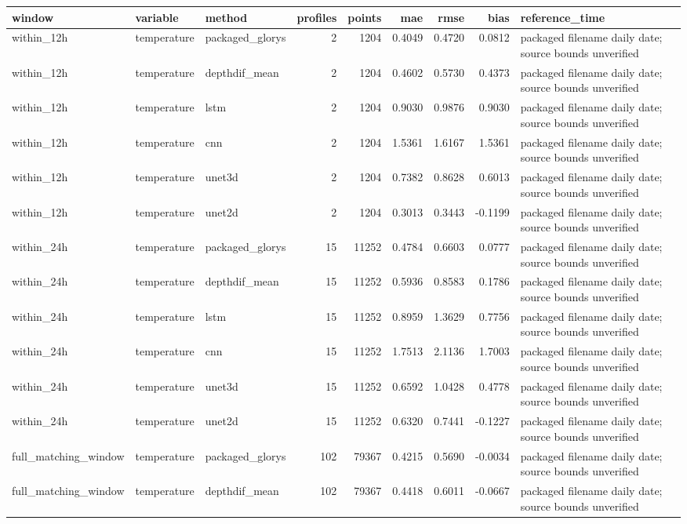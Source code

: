 \begin{tabular}{lllrrrrrl}
\toprule
window & variable & method & profiles & points & mae & rmse & bias & reference_time \\
\midrule
within_12h & temperature & packaged_glorys & 2 & 1204 & 0.4049 & 0.4720 & 0.0812 & packaged filename daily date; source bounds unverified \\
within_12h & temperature & depthdif_mean & 2 & 1204 & 0.4602 & 0.5730 & 0.4373 & packaged filename daily date; source bounds unverified \\
within_12h & temperature & lstm & 2 & 1204 & 0.9030 & 0.9876 & 0.9030 & packaged filename daily date; source bounds unverified \\
within_12h & temperature & cnn & 2 & 1204 & 1.5361 & 1.6167 & 1.5361 & packaged filename daily date; source bounds unverified \\
within_12h & temperature & unet3d & 2 & 1204 & 0.7382 & 0.8628 & 0.6013 & packaged filename daily date; source bounds unverified \\
within_12h & temperature & unet2d & 2 & 1204 & 0.3013 & 0.3443 & -0.1199 & packaged filename daily date; source bounds unverified \\
within_24h & temperature & packaged_glorys & 15 & 11252 & 0.4784 & 0.6603 & 0.0777 & packaged filename daily date; source bounds unverified \\
within_24h & temperature & depthdif_mean & 15 & 11252 & 0.5936 & 0.8583 & 0.1786 & packaged filename daily date; source bounds unverified \\
within_24h & temperature & lstm & 15 & 11252 & 0.8959 & 1.3629 & 0.7756 & packaged filename daily date; source bounds unverified \\
within_24h & temperature & cnn & 15 & 11252 & 1.7513 & 2.1136 & 1.7003 & packaged filename daily date; source bounds unverified \\
within_24h & temperature & unet3d & 15 & 11252 & 0.6592 & 1.0428 & 0.4778 & packaged filename daily date; source bounds unverified \\
within_24h & temperature & unet2d & 15 & 11252 & 0.6320 & 0.7441 & -0.1227 & packaged filename daily date; source bounds unverified \\
full_matching_window & temperature & packaged_glorys & 102 & 79367 & 0.4215 & 0.5690 & -0.0034 & packaged filename daily date; source bounds unverified \\
full_matching_window & temperature & depthdif_mean & 102 & 79367 & 0.4418 & 0.6011 & -0.0667 & packaged filename daily date; source bounds unverified \\

\end{tabular}
